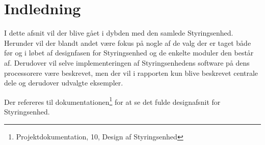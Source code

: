 
\section{Indledning}

I dette afsnit vil der blive gået i dybden med den samlede Styringsenhed. Herunder vil der blandt andet være fokus på nogle af de valg der er taget både før og i løbet af designfasen for Styringsenhed og de enkelte moduler den består af. Derudover vil selve implementeringen af Styringsenhedens software på dens processorere være beskrevet, men der vil i rapporten kun blive beskrevet centrale dele og derudover udvalgte eksempler.



Der refereres til dokumentationen\footnote{Projektdokumentation, 10, Design af Styringsenhed} for at se det fulde designafsnit for Styringsenhed.

